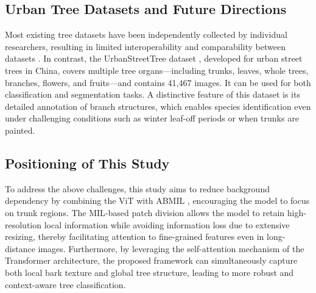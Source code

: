 \subsection{Urban Tree Datasets and Future Directions}
Most existing tree datasets have been independently collected by individual researchers, resulting in limited interoperability and comparability between datasets \cite{ref4}. In contrast, the UrbanStreetTree dataset \cite{ref11}, developed for urban street trees in China, covers multiple tree organs—including trunks, leaves, whole trees, branches, flowers, and fruits—and contains 41,467 images. It can be used for both classification and segmentation tasks. A distinctive feature of this dataset is its detailed annotation of branch structures, which enables species identification even under challenging conditions such as winter leaf-off periods or when trunks are painted.

\subsection{Positioning of This Study}
To address the above challenges, this study aims to reduce background dependency by combining the ViT \cite{ref1} with ABMIL \cite{ref2}, encouraging the model to focus on trunk regions. The MIL-based patch division allows the model to retain high-resolution local information while avoiding information loss due to extensive resizing, thereby facilitating attention to fine-grained features even in long-distance images. Furthermore, by leveraging the self-attention mechanism of the Transformer architecture, the proposed framework can simultaneously capture both local bark texture and global tree structure, leading to more robust and context-aware tree classification.

